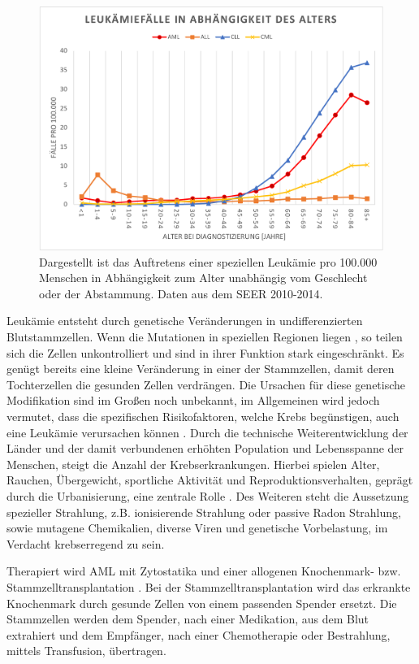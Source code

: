 \begin{figure}
\centering
\includegraphics[width=.99\textwidth]{images/Age_AML_ALL.pdf}
\caption{Dargestellt ist das Auftretens einer speziellen Leukämie pro 100.000 Menschen in Abhängigkeit zum Alter unabhängig vom Geschlecht oder der Abstammung. Daten aus dem SEER 2010-2014.}
\label{fig:Age_AML_ALL}
\end{figure}

Leukämie entsteht durch genetische Veränderungen in undifferenzierten Blutstammzellen. Wenn die Mutationen in speziellen Regionen liegen \cite{Wakita.2016}, so teilen sich die Zellen unkontrolliert und sind in ihrer Funktion stark eingeschränkt. Es genügt bereits eine kleine Veränderung in einer der Stammzellen, damit deren Tochterzellen die gesunden Zellen verdrängen. Die Ursachen für diese genetische Modifikation sind im Großen noch unbekannt, im Allgemeinen wird jedoch vermutet, dass die spezifischen Risikofaktoren, welche Krebs begünstigen, auch eine Leukämie verursachen können \cite{Petit.2014}. Durch die technische Weiterentwicklung der Länder und der damit verbundenen erhöhten Population und Lebensspanne der Menschen, steigt die Anzahl der Krebserkrankungen. Hierbei spielen Alter, Rauchen, Übergewicht, sportliche Aktivität und Reproduktionsverhalten, geprägt durch die Urbanisierung, eine zentrale Rolle \cite{Torre.2015}. Des Weiteren steht die Aussetzung spezieller Strahlung, z.B. ionisierende Strahlung oder passive Radon Strahlung, sowie mutagene Chemikalien, diverse Viren und genetische Vorbelastung, im Verdacht krebserregend zu sein.

Therapiert wird \ac{AML} mit Zytostatika und einer allogenen Knochenmark- bzw. Stammzelltransplantation \cite{Cheson.2003}. Bei der Stamm\-zell\-trans\-plan\-tat\-ion wird das erkrankte Knochenmark durch gesunde Zellen von einem passenden Spender ersetzt. Die Stammzellen werden dem Spender, nach einer Medikation, aus dem Blut extrahiert und dem Empfänger, nach einer Chemotherapie oder Bestrahlung, mittels Transfusion, übertragen. 

